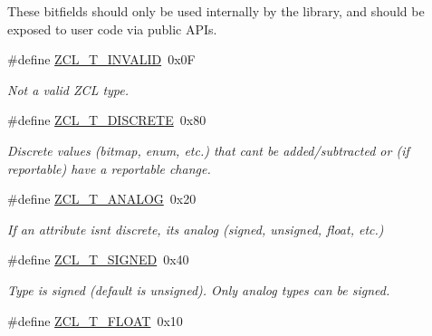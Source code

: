 These bitfields should only be used internally by the library, and should be exposed to user code via public A\+P\+Is. \begin{DoxyCompactItemize}
\item 
\mbox{\label{group__zcl__types_ga7609ed68cf4399cb2c09799ecedfdbe0}} 
\#define \hyperlink{group__zcl__types_ga7609ed68cf4399cb2c09799ecedfdbe0}{Z\+C\+L\+\_\+\+T\+\_\+\+I\+N\+V\+A\+L\+ID}~0x0F
\begin{DoxyCompactList}\small\item\em Not a valid Z\+CL type. \end{DoxyCompactList}\item 
\#define \hyperlink{group__zcl__types_ga3e9bf95af4f58a0c9c5c34639b0dda29}{Z\+C\+L\+\_\+\+T\+\_\+\+D\+I\+S\+C\+R\+E\+TE}~0x80
\begin{DoxyCompactList}\small\item\em Discrete values (bitmap, enum, etc.) that can\textquotesingle{}t be added/subtracted or (if reportable) have a reportable change. \end{DoxyCompactList}\item 
\mbox{\label{group__zcl__types_ga7b609984d4662f83a2248d1f485fd4ad}} 
\#define \hyperlink{group__zcl__types_ga7b609984d4662f83a2248d1f485fd4ad}{Z\+C\+L\+\_\+\+T\+\_\+\+A\+N\+A\+L\+OG}~0x20
\begin{DoxyCompactList}\small\item\em If an attribute isn\textquotesingle{}t discrete, it\textquotesingle{}s analog (signed, unsigned, float, etc.) \end{DoxyCompactList}\item 
\mbox{\label{group__zcl__types_gaacf8dcd439ce0388d90681aec545e4e3}} 
\#define \hyperlink{group__zcl__types_gaacf8dcd439ce0388d90681aec545e4e3}{Z\+C\+L\+\_\+\+T\+\_\+\+S\+I\+G\+N\+ED}~0x40
\begin{DoxyCompactList}\small\item\em Type is signed (default is unsigned). Only analog types can be signed. \end{DoxyCompactList}\item 
\mbox{\label{group__zcl__types_gaad99789b034d1ed0a2825e075bba62af}} 
\#define \hyperlink{group__zcl__types_gaad99789b034d1ed0a2825e075bba62af}{Z\+C\+L\+\_\+\+T\+\_\+\+F\+L\+O\+AT}~0x10

\end{DoxyCompactItemize}
